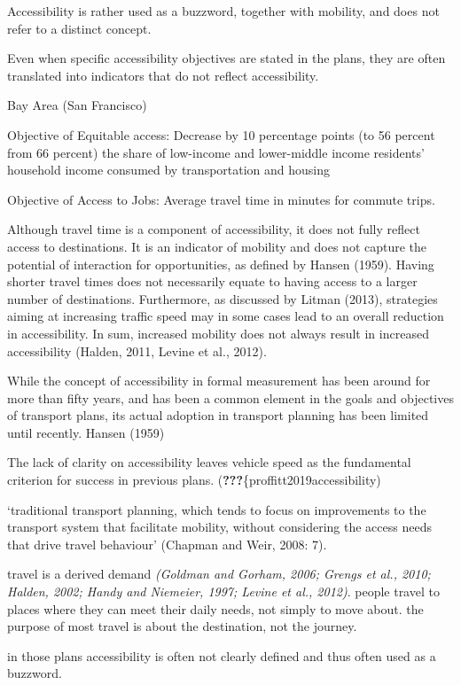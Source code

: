 \documentclass[12pt,]{article}
\begin{document}
Accessibility is rather used as a buzzword, together with mobility, and
does not refer to a distinct concept.

Even when specific accessibility objectives are stated in the plans,
they are often translated into indicators that do not reflect
accessibility.

Bay Area (San Francisco)

Objective of Equitable access: Decrease by 10 percentage points (to 56
percent from 66 percent) the share of low-income and lower-middle income
residents' household income consumed by transportation and housing

Objective of Access to Jobs: Average travel time in minutes for commute
trips.

Although travel time is a component of accessibility, it does not fully
reflect access to destinations. It is an indicator of mobility and does
not capture the potential of interaction for opportunities, as defined
by Hansen (1959). Having shorter travel times does not necessarily
equate to having access to a larger number of destinations. Furthermore,
as discussed by Litman (2013), strategies aiming at increasing traffic
speed may in some cases lead to an overall reduction in accessibility.
In sum, increased mobility does not always result in increased
accessibility (Halden, 2011, Levine et al., 2012).

While the concept of accessibility in formal measurement has been around
for more than fifty years, and has been a common element in the goals
and objectives of transport plans, its actual adoption in transport
planning has been limited until recently. Hansen (1959)

The lack of clarity on accessibility leaves vehicle speed as the
fundamental criterion for success in previous plans.
({\textbf{???}}\{proffitt2019accessibility)

`traditional transport planning, which tends to focus on improvements to
the transport system that facilitate mobility, without considering the
access needs that drive travel behaviour' (Chapman and Weir, 2008: 7).

travel is a derived demand \emph{(Goldman and Gorham, 2006; Grengs et
al., 2010; Halden, 2002; Handy and Niemeier, 1997; Levine et al.,
2012)}. people travel to places where they can meet their daily needs,
not simply to move about. the purpose of most travel is about the
destination, not the journey.

in those plans accessibility is often not clearly defined and thus often
used as a buzzword.
\end{document}
